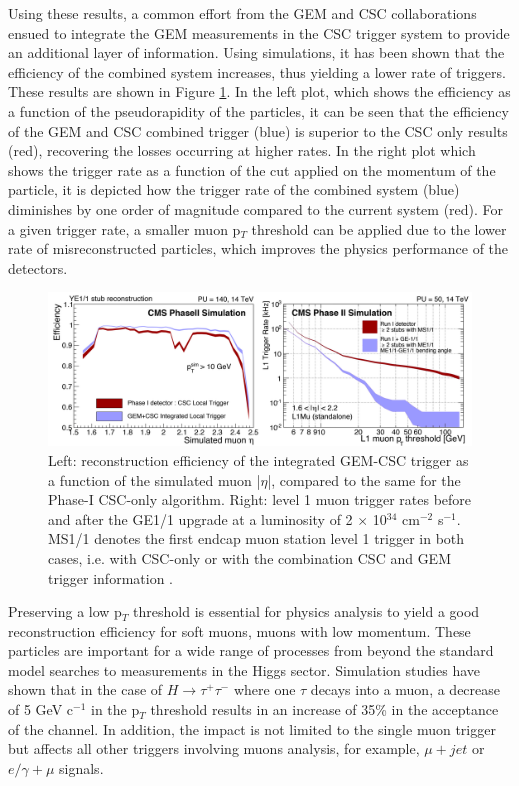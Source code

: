     Using these results, a common effort from the GEM and CSC collaborations ensued to integrate the GEM measurements in the CSC trigger system to provide an additional layer of information. Using simulations, it has been shown that the efficiency of the combined system increases, thus yielding a lower rate of triggers. These results are shown in Figure \ref{fig:II-1-trigger}. In the left plot, which shows the efficiency as a function of the pseudorapidity of the particles, it can be seen that the efficiency of the GEM and CSC combined trigger (blue) is superior to the CSC only results (red), recovering the losses occurring at higher rates. In the right plot which shows the trigger rate as a function of the cut applied on the momentum of the particle, it is depicted how the trigger rate of the combined system (blue) diminishes by one order of magnitude compared to the current system (red). For a given trigger rate, a smaller muon p$_T$ threshold can be applied due to the lower rate of misreconstructed particles, which improves the physics performance of the detectors. \\

    \begin{figure}[h!]
      \centering
      \includegraphics[width=\textwidth]{img/II-1-gem/gem-csc-efficiency.pdf}
      \caption{Left: reconstruction efficiency of the integrated GEM-CSC trigger as a function of the simulated muon |$\eta$|, compared to the same for the Phase-I CSC-only algorithm. Right: level 1 muon trigger rates before and after the GE1/1 upgrade at a luminosity of 2 $\times$ 10$^{34}$ cm$^{-2}$ s$^{-1}$. MS1/1 denotes the first endcap muon station level 1 trigger in both cases, i.e. with CSC-only or with the combination CSC and GEM trigger information \cite{Colaleo:2021453}.}
      \label{fig:II-1-trigger}
    \end{figure}

    Preserving a low p$_T$ threshold is essential for physics analysis to yield a good reconstruction efficiency for soft muons, muons with low momentum. These particles are important for a wide range of processes from beyond the standard model searches to measurements in the Higgs sector. Simulation studies have shown that in the case of $ H \rightarrow \tau^+ \tau^- $ where one $ \tau $ decays into a muon, a decrease of 5 GeV c$^{-1}$ in the p$_T$ threshold results in an increase of 35\% in the acceptance of the channel. In addition, the impact is not limited to the single muon trigger but affects all other triggers involving muons analysis, for example, $\mu+jet$ or $e/\gamma+\mu$ signals. \\


